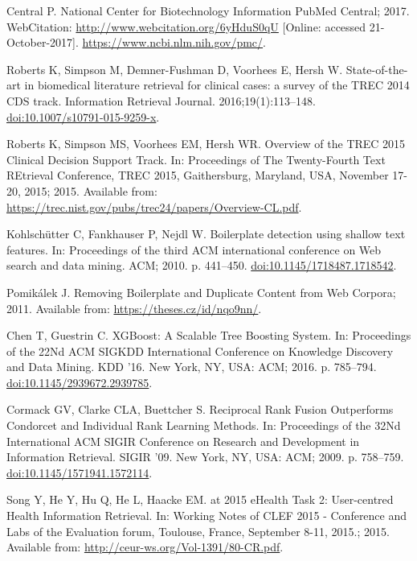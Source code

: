 \documentclass[10pt,a4paper]{article}
\begin{document}
\begin{thebibliography}{10}
	Central P. National Center for Biotechnology Information PubMed Central; 2017.
	\newblock WebCitation: \url{http://www.webcitation.org/6yHduS0qU} [Online:
	accessed 21-October-2017].
	\newblock \url{https://www.ncbi.nlm.nih.gov/pmc/}.
	
	Roberts K, Simpson M, Demner-Fushman D, Voorhees E, Hersh W.
	\newblock State-of-the-art in biomedical literature retrieval for clinical
	cases: a survey of the TREC 2014 CDS track.
	\newblock Information Retrieval Journal. 2016;19(1):113--148.
	\newblock \href {http://dx.doi.org/10.1007/s10791-015-9259-x}
	{doi:10.1007/s10791-015-9259-x}.
	
	Roberts K, Simpson MS, Voorhees EM, Hersh WR.
	\newblock Overview of the {TREC} 2015 Clinical Decision Support Track.
	\newblock In: Proceedings of The Twenty-Fourth Text REtrieval Conference,
	{TREC} 2015, Gaithersburg, Maryland, USA, November 17-20, 2015; 2015.
	Available from:
	\url{https://trec.nist.gov/pubs/trec24/papers/Overview-CL.pdf}.
	
	Kohlsch{\"u}tter C, Fankhauser P, Nejdl W.
	\newblock Boilerplate detection using shallow text features.
	\newblock In: Proceedings of the third ACM international conference on Web
	search and data mining. ACM; 2010. p. 441--450.
	\newblock \href {http://dx.doi.org/10.1145/1718487.1718542}
	{doi:10.1145/1718487.1718542}.
	
	Pomik\'{a}lek J. Removing Boilerplate and Duplicate Content from Web Corpora;
	2011.
	\newblock Available from: \url{https://theses.cz/id/nqo9nn/}.
	
	Chen T, Guestrin C.
	\newblock XGBoost: A Scalable Tree Boosting System.
	\newblock In: Proceedings of the 22Nd ACM SIGKDD International Conference on
	Knowledge Discovery and Data Mining. KDD '16. New York, NY, USA: ACM; 2016.
	p. 785--794.
	\newblock \href {http://dx.doi.org/10.1145/2939672.2939785}
	{doi:10.1145/2939672.2939785}.
	
	Cormack GV, Clarke CLA, Buettcher S.
	\newblock Reciprocal Rank Fusion Outperforms Condorcet and Individual Rank
	Learning Methods.
	\newblock In: Proceedings of the 32Nd International ACM SIGIR Conference on
	Research and Development in Information Retrieval. SIGIR '09. New York, NY,
	USA: ACM; 2009. p. 758--759.
	\newblock \href {http://dx.doi.org/10.1145/1571941.1572114}
	{doi:10.1145/1571941.1572114}.
	
	Song Y, He Y, Hu Q, He L, Haacke EM.
	 at 2015 eHealth Task 2: User-centred Health Information
	Retrieval.
	\newblock In: Working Notes of {CLEF} 2015 - Conference and Labs of the
	Evaluation forum, Toulouse, France, September 8-11, 2015.; 2015. Available
	from: \url{http://ceur-ws.org/Vol-1391/80-CR.pdf}.
	

\end{thebibliography}
\end{document}
